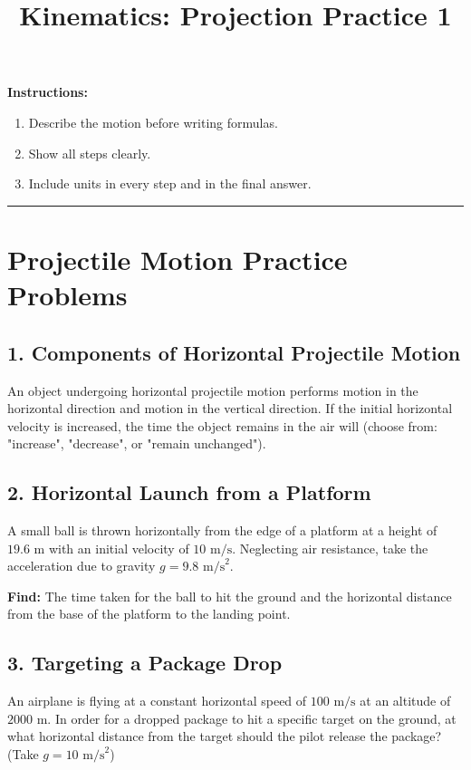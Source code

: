 \documentclass[12pt]{article}
\begin{document}
\title{Kinematics: Projection Practice 1}
\author{}
\date{}
\maketitle

\vspace{1em}

\textbf{Instructions:}

\begin{enumerate}
\item Describe the motion before writing formulas.
\item Show all steps clearly.
\item Include units in every step and in the final answer.
\end{enumerate}

\noindent\rule{\textwidth}{0.4pt}

\newpage

\section*{Projectile Motion Practice Problems}

\subsection*{1. Components of Horizontal Projectile Motion}
An object undergoing horizontal projectile motion performs \underline{\hspace{3cm}} motion in the horizontal direction and \underline{\hspace{3cm}} motion in the vertical direction. If the initial horizontal velocity is increased, the time the object remains in the air will \underline{\hspace{3cm}} (choose from: "increase", "decrease", or "remain unchanged").

\subsection*{2. Horizontal Launch from a Platform}
A small ball is thrown horizontally from the edge of a platform at a height of $19.6 \text{ m}$ with an initial velocity of $10 \text{ m/s}$. Neglecting air resistance, take the acceleration due to gravity $g = 9.8 \text{ m/s}^2$.

\textbf{Find:} The time taken for the ball to hit the ground and the horizontal distance from the base of the platform to the landing point.
\newpage
\subsection*{3. Targeting a Package Drop}
An airplane is flying at a constant horizontal speed of $100 \text{ m/s}$ at an altitude of $2000 \text{ m}$. In order for a dropped package to hit a specific target on the ground, at what horizontal distance from the target should the pilot release the package? (Take $g = 10 \text{ m/s}^2$)
\end{document}
